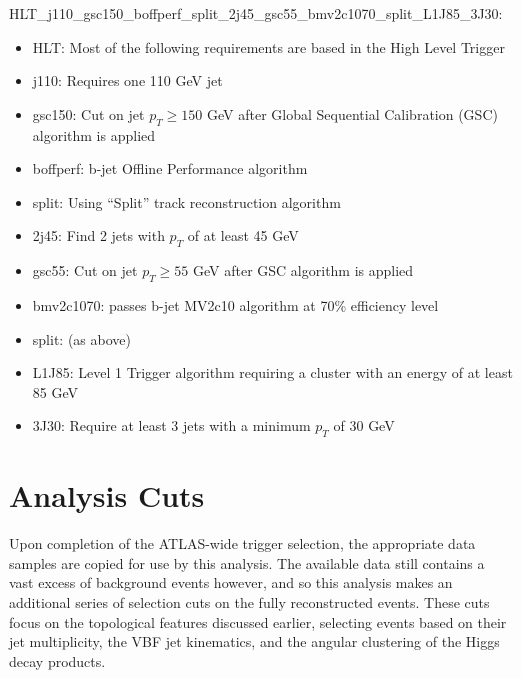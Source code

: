         HLT\_j110\_gsc150\_boffperf\_split\_2j45\_gsc55\_bmv2c1070\_split\_L1J85\_3J30:
        \begin{itemize}
            \item HLT: Most of the following requirements are based in the High Level Trigger
            \item j110: Requires one 110 GeV jet
            \item gsc150: Cut on jet $p_T \geq 150$ GeV after Global Sequential Calibration (GSC) algorithm is applied
            \item boffperf: b-jet Offline Performance algorithm
            \item split: Using ``Split'' track reconstruction algorithm
            \item 2j45: Find 2 jets with $p_T$ of at least 45 GeV
            \item gsc55: Cut on jet $p_T \geq 55$ GeV after GSC algorithm is applied
            \item bmv2c1070: passes b-jet MV2c10 algorithm at 70\% efficiency level
            \item split: (as above)
            \item L1J85: Level 1 Trigger algorithm requiring a cluster with an energy of at least 85 GeV 
            \item 3J30: Require at least 3 jets with a minimum $p_T$ of 30 GeV
        \end{itemize}


        




    \section{Analysis Cuts} \label{sec:analysis_cuts}

        Upon completion of the ATLAS-wide trigger selection,
            the appropriate data samples are copied for use by this analysis.
        The available data still contains a vast excess of background events however,
            and so this analysis makes an additional series of selection cuts on the fully reconstructed events.
        These cuts focus on the topological features discussed earlier,
            selecting events based on their jet multiplicity,
            the VBF jet kinematics,
            and the angular clustering of the Higgs decay products.


